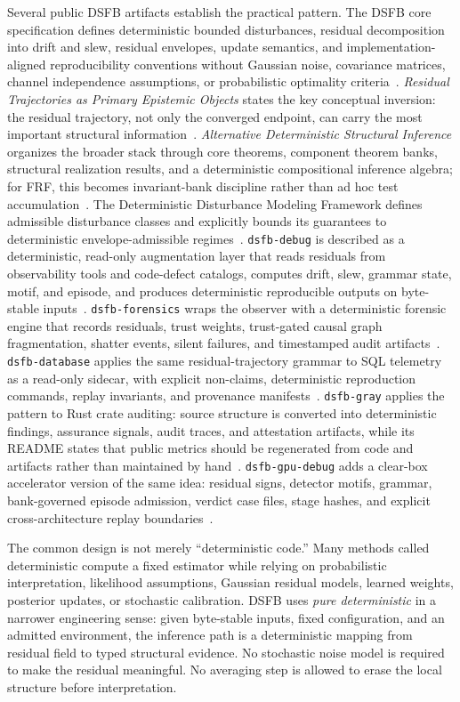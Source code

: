 \documentclass[11pt,a4paper]{article}
\newcommand{\frf}{\textsc{FRF}}
\newcommand{\dsfb}{\textsc{DSFB}}
\begin{document}
Several public \dsfb{} artifacts establish the practical pattern. The DSFB core specification defines deterministic bounded disturbances, residual decomposition into drift and slew, residual envelopes, update semantics, and implementation-aligned reproducibility conventions without Gaussian noise, covariance matrices, channel independence assumptions, or probabilistic optimality criteria~\cite{dsfbcore}. \emph{Residual Trajectories as Primary Epistemic Objects} states the key conceptual inversion: the residual trajectory, not only the converged endpoint, can carry the most important structural information~\cite{residualtrajectories}. \emph{Alternative Deterministic Structural Inference} organizes the broader stack through core theorems, component theorem banks, structural realization results, and a deterministic compositional inference algebra; for \frf{}, this becomes invariant-bank discipline rather than ad hoc test accumulation~\cite{alternativedsi}. The Deterministic Disturbance Modeling Framework defines admissible disturbance classes and explicitly bounds its guarantees to deterministic envelope-admissible regimes~\cite{ddmf}. \texttt{dsfb-debug} is described as a deterministic, read-only augmentation layer that reads residuals from observability tools and code-defect catalogs, computes drift, slew, grammar state, motif, and episode, and produces deterministic reproducible outputs on byte-stable inputs~\cite{dsfbdebug}. \texttt{dsfb-forensics} wraps the observer with a deterministic forensic engine that records residuals, trust weights, trust-gated causal graph fragmentation, shatter events, silent failures, and timestamped audit artifacts~\cite{dsfbforensics}. \texttt{dsfb-database} applies the same residual-trajectory grammar to SQL telemetry as a read-only sidecar, with explicit non-claims, deterministic reproduction commands, replay invariants, and provenance manifests~\cite{dsfbdatabase}. \texttt{dsfb-gray} applies the pattern to Rust crate auditing: source structure is converted into deterministic findings, assurance signals, audit traces, and attestation artifacts, while its README states that public metrics should be regenerated from code and artifacts rather than maintained by hand~\cite{dsfbgray}. \texttt{dsfb-gpu-debug} adds a clear-box accelerator version of the same idea: residual signs, detector motifs, grammar, bank-governed episode admission, verdict case files, stage hashes, and explicit cross-architecture replay boundaries~\cite{dsfbgpu}.

The common design is not merely ``deterministic code.'' Many methods called deterministic compute a fixed estimator while relying on probabilistic interpretation, likelihood assumptions, Gaussian residual models, learned weights, posterior updates, or stochastic calibration. \dsfb{} uses \emph{pure deterministic} in a narrower engineering sense: given byte-stable inputs, fixed configuration, and an admitted environment, the inference path is a deterministic mapping from residual field to typed structural evidence. No stochastic noise model is required to make the residual meaningful. No averaging step is allowed to erase the local structure before interpretation.
\end{document}
